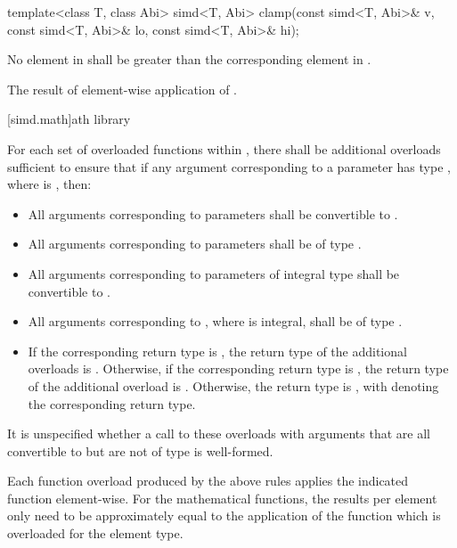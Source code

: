 \begin{itemdecl}
template<class T, class Abi> simd<T, Abi>
  clamp(const simd<T, Abi>& v, const simd<T, Abi>& lo, const simd<T, Abi>& hi);
\end{itemdecl}

\begin{itemdescr}
  \pnum\requires
  No element in  shall be greater than the corresponding element in .

  \pnum\returns
  The result of element-wise application of  \foralli.
\end{itemdescr}

[simd.math]{\texorpdfstring{ath}{simd math} library}

\pnum
For each set of overloaded functions within , there shall be additional overloads sufficient to ensure that if any argument corresponding to a  parameter has type , where  is , then:
\begin{itemize}
  \item All arguments corresponding to  parameters shall be convertible to .
  \item All arguments corresponding to  parameters shall be of type .
  \item All arguments corresponding to parameters of integral type  shall be convertible to .
  \item All arguments corresponding to , where  is integral, shall be of type .
  \item If the corresponding return type is , the return type of the additional overloads is . Otherwise, if the corresponding return type is , the return type of the additional overload is . Otherwise, the return type is , with  denoting the corresponding return type.
\end{itemize}
It is unspecified whether a call to these overloads with arguments that are all convertible to  but are not of type  is well-formed.

\pnum
Each function overload produced by the above rules applies the indicated  function element-wise. For the mathematical functions, the results per element only need to be approximately equal to the application of the function which is overloaded for the element type.

